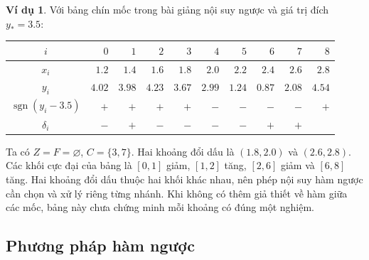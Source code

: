 \documentclass[12pt,a4paper,oneside]{book}
\numberwithin{algorithm}{chapter}
\theoremstyle{definition}
\newtheorem{vidu}{Ví dụ}[chapter]
\begin{document}
\begin{vidu}
Với bảng chín mốc trong bài giảng nội suy ngược \cite{inverse-slides} và giá trị đích $y_\ast=3.5$:
\begin{center}
\small\setlength{\tabcolsep}{4pt}
\begin{tabular}{c|rrrrrrrrr}\toprule
$i$&$0$&$1$&$2$&$3$&$4$&$5$&$6$&$7$&$8$\\\midrule
$x_i$&$1.2$&$1.4$&$1.6$&$1.8$&$2.0$&$2.2$&$2.4$&$2.6$&$2.8$\\
$y_i$&$4.02$&$3.98$&$4.23$&$3.67$&$2.99$&$1.24$&$0.87$&$2.08$&$4.54$\\
$\operatorname{sgn}(y_i-3.5)$&$+$&$+$&$+$&$+$&$-$&$-$&$-$&$-$&$+$\\
$\delta_i$&$-$&$+$&$-$&$-$&$-$&$-$&$+$&$+$&\\\bottomrule
\end{tabular}
\end{center}
Ta có $Z=F=\varnothing$, $C=\{3,7\}$. Hai khoảng đổi dấu là $(1.8,2.0)$ và $(2.6,2.8)$. Các khối cực đại của bảng là $[0,1]$ giảm, $[1,2]$ tăng, $[2,6]$ giảm và $[6,8]$ tăng. Hai khoảng đổi dấu thuộc hai khối khác nhau, nên phép nội suy hàm ngược cần chọn và xử lý riêng từng nhánh. Khi không có thêm giả thiết về hàm giữa các mốc, bảng này chưa chứng minh mỗi khoảng có đúng một nghiệm.
\end{vidu}

\subsection{Phương pháp hàm ngược}
\end{document}
